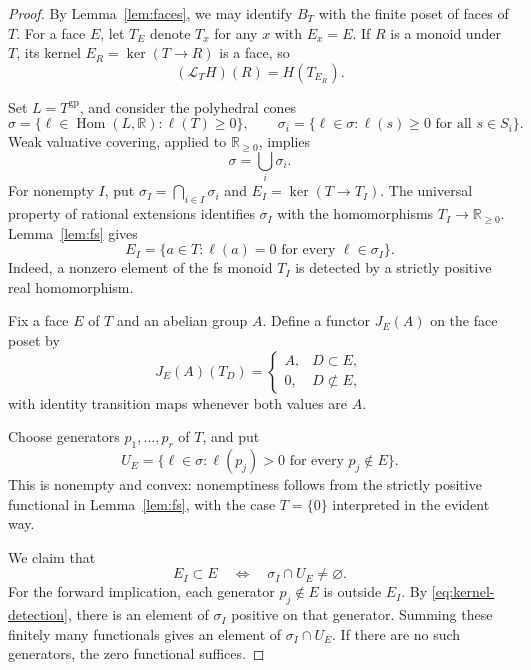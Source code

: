 \documentclass[11pt]{article}
\theoremstyle{definition}
\theoremstyle{remark}
\DeclareMathOperator{\Hom}{Hom}
\newcommand{\gp}{\mathrm{gp}}
\newcommand{\RR}{\mathbb R}
\newcommand{\LL}{\mathcal L}
\begin{document}
\begin{proof}
By Lemma~\ref{lem:faces}, we may identify \(B_T\) with the finite
poset of faces of \(T\). For a face \(E\), let \(T_E\) denote
\(T_x\) for any \(x\) with \(E_x=E\). If \(R\) is a monoid under
\(T\), its kernel \(E_R=\ker(T\to R)\) is a face, so
\begin{equation}\label{eq:fs-value}
(\LL_TH)(R)=H(T_{E_R}).
\end{equation}

Set \(L=T^{\gp}\), and consider the polyhedral cones
\[
\sigma=\{\ell\in\Hom(L,\RR):\ell(T)\ge0\},
\qquad
\sigma_i=\{\ell\in\sigma:\ell(s)\ge0\text{ for all }s\in S_i\}.
\]
Weak valuative covering, applied to \(\RR_{\ge0}\), implies
\[
\sigma=\bigcup_i\sigma_i.
\]
For nonempty \(I\), put \(\sigma_I=\bigcap_{i\in I}\sigma_i\) and
\(E_I=\ker(T\to T_I)\). The universal property of rational
extensions identifies \(\sigma_I\) with the homomorphisms
\(T_I\to\RR_{\ge0}\). Lemma~\ref{lem:fs} gives
\begin{equation}\label{eq:kernel-detection}
E_I=\{a\in T:\ell(a)=0\text{ for every }\ell\in\sigma_I\}.
\end{equation}
Indeed, a nonzero element of the fs monoid \(T_I\) is detected by a
strictly positive real homomorphism.

Fix a face \(E\) of \(T\) and an abelian group \(A\). Define a
functor \(J_E(A)\) on the face poset by
\[
J_E(A)(T_D)=
\begin{cases}
A,&D\subset E,\\
0,&D\not\subset E,
\end{cases}
\]
with identity transition maps whenever both values are \(A\).

Choose generators \(p_1,\ldots,p_r\) of \(T\), and put
\[
U_E=\{\ell\in\sigma:\ell(p_j)>0
\text{ for every }p_j\notin E\}.
\]
This is nonempty and convex: nonemptiness follows from the
strictly positive functional in Lemma~\ref{lem:fs}, with the case
\(T=\{0\}\) interpreted in the evident way.

We claim that
\begin{equation}\label{eq:nerve-kernel}
E_I\subset E
\quad\Longleftrightarrow\quad
\sigma_I\cap U_E\ne\varnothing.
\end{equation}
For the forward implication, each generator \(p_j\notin E\) is
outside \(E_I\). By \eqref{eq:kernel-detection}, there is an element
of \(\sigma_I\) positive on that generator. Summing these finitely
many functionals gives an element of \(\sigma_I\cap U_E\).
If there are no such generators, the zero functional suffices.


\end{proof}
\end{document}
